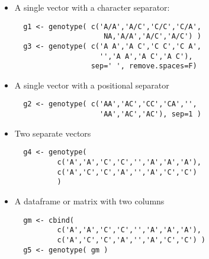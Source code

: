 \documentclass{report}
\begin{document}
\begin{itemize} 
\item A single vector with a character separator:
  {\small
\begin{verbatim} 
  g1 <- genotype( c('A/A','A/C','C/C','C/A',
                     NA,'A/A','A/C','A/C') )
  g3 <- genotype( c('A A','A C','C C','C A',
                    '','A A','A C','A C'), 
                  sep=' ', remove.spaces=F)
\end{verbatim}
}  


\item A single vector with a positional separator
  {\small
\begin{verbatim}
  g2 <- genotype( c('AA','AC','CC','CA','',
                    'AA','AC','AC'), sep=1 )
\end{verbatim}
}  


\item Two separate vectors
  {\small
\begin{verbatim}
  g4 <- genotype( 
          c('A','A','C','C','','A','A','A'),
          c('A','C','C','A','','A','C','C')
          )
\end{verbatim}
}  

\item A dataframe or matrix with two columns
  {\small
\begin{verbatim}
  gm <- cbind( 
          c('A','A','C','C','','A','A','A'),
          c('A','C','C','A','','A','C','C') ) 
  g5 <- genotype( gm )
\end{verbatim}
}  
\end{itemize}
\end{document}
